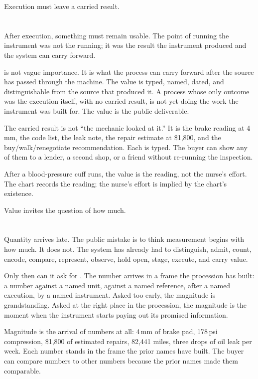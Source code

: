 Execution must leave a carried result.

\section{}
\label{se:value}

After execution, something must remain usable. The point of running the
instrument was not the running; it was the result the instrument
produced and the system can carry forward.

 is not vague importance. It is what the process can carry
forward after the source has passed through the machine. The value is
typed, named, dated, and distinguishable from the source that produced
it. A process whose only outcome was the execution itself, with no
carried result, is not yet doing the work the instrument was built for.
The value is the public deliverable.

The carried result is not ``the mechanic looked at it.'' It is the brake
reading at 4{\,}mm, the code list, the leak note, the repair estimate
at \$1{,}800, and the buy/walk/renegotiate recommendation. Each is
typed. The buyer can show any of them to a lender, a second shop, or a
friend without re-running the inspection.

After a blood-pressure cuff runs, the value is the reading, not the
nurse's effort. The chart records the reading; the nurse's effort is
implied by the chart's existence.

Value invites the question of how much.

\section{}
\label{se:magnitude}

Quantity arrives late. The public mistake is to think measurement begins
with how much. It does not. The system has already had to distinguish,
admit, count, encode, compare, represent, observe, hold open, stage,
execute, and carry value.

Only then can it ask for . The number arrives in a
frame the procession has built: a number against a named unit, against
a named reference, after a named execution, by a named instrument.
Asked too early, the magnitude is grandstanding. Asked at the right
place in the procession, the magnitude is the moment when the
instrument starts paying out its promised information.

Magnitude is the arrival of numbers at all: 4{\,}mm of brake pad,
178{\,}psi compression, \$1{,}800 of estimated repairs, 82{,}441 miles,
three drops of oil leak per week. Each number stands in the frame the
prior names have built. The buyer can compare numbers to other numbers
because the prior names made them comparable.

